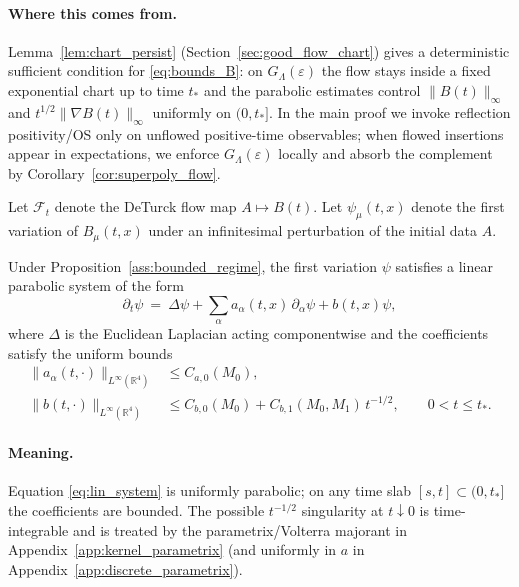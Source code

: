 \paragraph{Where this comes from.}
Lemma~\ref{lem:chart_persist} (Section~\ref{sec:good_flow_chart}) gives a deterministic sufficient condition for
\eqref{eq:bounds_B}: on $G_{\Lambda}(\varepsilon)$ the flow stays inside a fixed exponential chart up to time $t_\ast$ and the parabolic estimates
control $\|B(t)\|_\infty$ and $t^{1/2}\|\nabla B(t)\|_\infty$ uniformly on $(0,t_\ast]$.
In the main proof we invoke reflection positivity/OS only on unflowed positive-time observables; when flowed insertions appear in expectations,
we enforce $G_{\Lambda}(\varepsilon)$ locally and absorb the complement by Corollary~\ref{cor:superpoly_flow}.

Let $\mathcal F_t$ denote the DeTurck flow map $A\mapsto B(t)$.
Let $\psi_\mu(t,x)$ denote the first variation of $B_\mu(t,x)$ under an infinitesimal perturbation of the initial data $A$.

\begin{lemma}\label{lem:lin_parabolic}
Under Proposition~\ref{ass:bounded_regime}, the first variation $\psi$ satisfies a linear parabolic system of the form
\begin{equation}\label{eq:lin_system}
\partial_t \psi \ =\ \Delta \psi + \sum_{\alpha} a_\alpha(t,x)\,\partial_\alpha \psi + b(t,x)\psi,
\end{equation}
where $\Delta$ is the Euclidean Laplacian acting componentwise and the coefficients satisfy the uniform bounds
\[
\begin{aligned}
\|a_\alpha(t,\cdot)\|_{L^\infty(\mathbb R^4)}&\le C_{a,0}(M_0),\\
\|b(t,\cdot)\|_{L^\infty(\mathbb R^4)}&\le C_{b,0}(M_0)+C_{b,1}(M_0,M_1)\,t^{-1/2},
\qquad 0<t\le t_\ast.
\end{aligned}
\]
\end{lemma}

\paragraph{Meaning.}
Equation \eqref{eq:lin_system} is uniformly parabolic; on any time slab $[s,t]\subset(0,t_\ast]$ the coefficients are bounded.
The possible $t^{-1/2}$ singularity at $t\downarrow 0$ is time-integrable and is treated by the parametrix/Volterra majorant
in Appendix~\ref{app:kernel_parametrix} (and uniformly in $a$ in Appendix~\ref{app:discrete_parametrix}).

